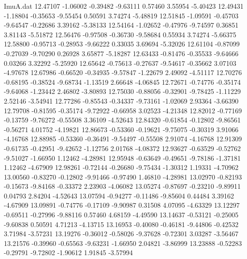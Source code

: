 \begin{filecontents}{ImuA.dat}
  12.47107   -1.06002   -0.39482   -9.63111    0.57460    3.55954   -5.40423
  12.49431   -1.18804   -0.35653   -9.55454    0.50591    3.74274   -5.48819
  12.51845   -1.09591   -0.45703   -9.64547   -0.22686    3.39162   -5.38133
  12.54164   -1.02652   -0.47976   -9.74597    0.36851    3.81143   -5.51872
  12.56476   -0.97508   -0.36730   -9.58684    0.55934    3.74274   -5.66375
  12.58800   -0.95713   -0.28953   -9.66222    0.33035    3.69694   -5.32026
  12.61104   -0.87099   -0.27039   -9.70290    0.26928    3.65877   -5.18287
  12.63433   -0.81476   -0.35533   -9.64666    0.03266    3.32292   -5.25920
  12.65642   -0.75613   -0.27637   -9.54617   -0.35662    3.07103   -4.97678
  12.67986   -0.66520   -0.34935   -9.57847   -1.22679    2.49092   -4.51117
  12.70276   -0.68195   -0.38524   -9.68734   -1.13519    2.66648   -4.06845
  12.72671   -0.74776   -0.35174   -9.64068   -1.23442    2.46802   -3.80893
  12.75030   -0.88056   -0.32901   -9.78425   -1.11229    2.52146   -3.54941
  12.77286   -0.85543   -0.34337   -9.73161   -1.02069    2.93364   -3.66390
  12.79708   -0.81595   -0.35174   -9.72922   -0.66958    3.02523   -4.21348
  12.82012   -0.77169   -0.13759   -9.76272   -0.55508    3.36109   -4.52643
  12.84320   -0.61854   -0.12802   -9.86561   -0.56271    4.01752   -4.19821
  12.86673   -0.53360   -0.19621   -9.75075   -0.30319    3.91066   -4.16768
  12.88985   -0.53360   -0.36491   -9.54497   -0.55508    2.91074   -4.16768
  12.91309   -0.61735   -0.42951   -9.42652   -1.12756    2.01768   -4.08372
  12.93627   -0.63529   -0.52762   -9.51027   -1.66950    1.12462   -4.28981
  12.95948   -0.63649   -0.49651   -9.78186   -1.37181    1.12462   -4.67909
  12.98261   -0.72144   -0.26680   -9.75434   -1.30312    1.19331   -4.70962
  13.00560   -0.83270   -0.12802   -9.91466   -0.97490    1.46810   -4.28981
  13.02970   -0.82193   -0.15673   -9.84168   -0.33372    2.23903   -4.06082
  13.05274   -0.87697   -0.23210   -9.89911    0.04793    2.84204   -4.52643
  13.07594   -0.94277   -0.11486   -9.85604    0.44484    3.39162   -4.67909
  13.09891   -0.74776   -0.17109   -9.90987    0.31508    4.07095   -4.63329
  13.12297   -0.69511   -0.27996   -9.88116    0.57460    4.68159   -4.49590
  13.14637   -0.53121   -0.25005   -9.60838    0.50591    4.71213   -4.13715
  13.16953   -0.40080   -0.46181   -9.44806   -0.42532    3.71984   -3.57231
  13.19276   -0.36012   -0.58026   -9.37628   -0.72301    3.03287   -3.56467
  13.21576   -0.39960   -0.65563   -9.63231   -1.66950    2.04821   -3.86999
  13.23888   -0.52283   -0.29791   -9.72802   -1.90612    1.91845   -3.57994

\end{filecontents}
